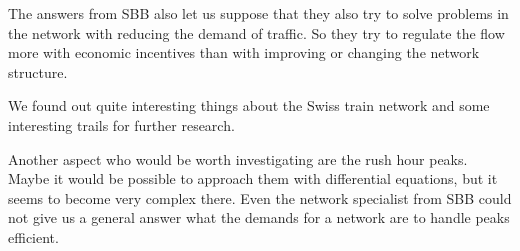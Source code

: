 \documentclass[11pt]{article}
\begin{document}
The answers from SBB also let us suppose that they also try to solve problems in the network with reducing the demand of traffic. So they try to regulate the flow more with economic incentives than with improving or changing the network structure.

We found out quite interesting things about the Swiss train network and some interesting trails for further research.\newline

Another aspect who would be worth investigating are the rush hour peaks. Maybe it would be possible to approach them with differential equations, but it seems to become very complex there. Even the network specialist from SBB could not give us a general answer what the demands for a network are to handle peaks efficient.








\newpage
\end{document}
